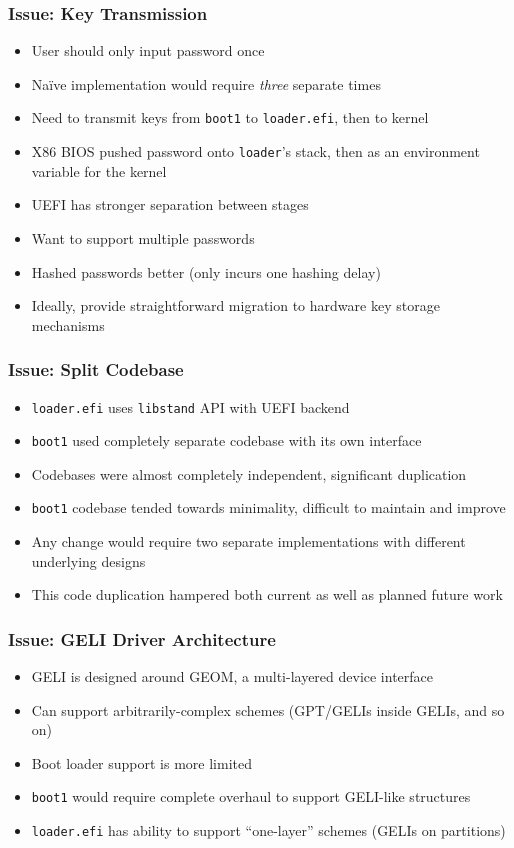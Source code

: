\documentclass{beamer}
\begin{document}
\begin{frame}
  \frametitle{Issue: Key Transmission}
  \begin{itemize}
  \item User should only input password once
  \item Na\"{i}ve implementation would require \emph{three} separate times
  \item Need to transmit keys from \texttt{boot1} to
    \texttt{loader.efi}, then to kernel
  \item X86 BIOS pushed password onto \texttt{loader}'s stack, then as
    an environment variable for the kernel
  \item UEFI has stronger separation between stages
  \item Want to support multiple passwords
  \item Hashed passwords better (only incurs one hashing delay)
  \item Ideally, provide straightforward migration to hardware key
    storage mechanisms
  \end{itemize}
\end{frame}

\begin{frame}
  \frametitle{Issue: Split Codebase}
  \begin{itemize}
  \item \texttt{loader.efi} uses \texttt{libstand} API with UEFI backend
  \item \texttt{boot1} used completely separate codebase with its own interface
  \item Codebases were almost completely independent, significant duplication
  \item \texttt{boot1} codebase tended towards minimality, difficult
    to maintain and improve
  \item Any change would require two separate implementations with
    different underlying designs
  \item This code duplication hampered both current as well as planned
    future work
  \end{itemize}
\end{frame}

\begin{frame}
  \frametitle{Issue: GELI Driver Architecture}
  \begin{itemize}
  \item GELI is designed around GEOM, a multi-layered device interface
  \item Can support arbitrarily-complex schemes (GPT/GELIs inside
    GELIs, and so on)
  \item Boot loader support is more limited
  \item \texttt{boot1} would require complete overhaul to support
    GELI-like structures
  \item \texttt{loader.efi} has ability to support ``one-layer''
    schemes (GELIs on partitions)
  \end{itemize}
\end{frame}
\end{document}
